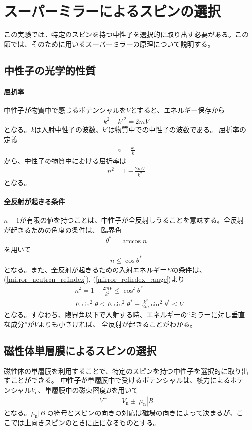 \section{スーパーミラーによるスピンの選択}
\nocite{neutron_spin_optics}
この実験では、特定のスピンを持つ中性子を選択的に取り出す必要がある。この節では、そのために用いるスーパーミラーの原理について説明する。

\subsection{中性子の光学的性質}
\paragraph{屈折率}
中性子が物質中で感じるポテンシャルを$V$とすると、エネルギー保存から
\begin{align}
k^2-k'^2=2mV
\end{align}
となる。$k$は入射中性子の波数、$k'$は物質中での中性子の波数である。
屈折率の定義
\begin{align}
n=\frac{k'}{k}
\end{align}
から、中性子の物質中における屈折率は
\begin{align}
n^2=1-\frac{2mV}{k^2}\label{mirror_neutron_refindex}
\end{align}
となる。

\paragraph{全反射が起きる条件}\label{mirrir_perfect_reflection}
$n-1$が有限の値を持つことは、中性子が全反射しうることを意味する。全反射が起きるための角度の条件は、
臨界角
\begin{align}
\theta^*=\arccos{n}
\end{align}
を用いて
\begin{align}
n\leq\cos\theta^* \label{mirror_refindex_range}
\end{align}
となる。また、全反射が起きるための入射エネルギー$E$の条件は、(\ref{mirror_neutron_refindex}), (\ref{mirror_refindex_range})より
\begin{align}
&n^2=1-\frac{2mV}{k^2}\leq\cos^2\theta^*\\
&E\sin^2\theta\leq E\sin^2\theta^*=\frac{k^2}{2m}\sin^2\theta^*\leq V
\end{align}
となる。すなわち、臨界角以下で入射する時、エネルギーの``ミラーに対し垂直な成分''が$V$よりも小さければ、
全反射が起きることがわかる。

\subsection{磁性体単層膜によるスピンの選択}
磁性体の単層膜を利用することで、特定のスピンを持つ中性子を選択的に取り出すことができる。
中性子が単層膜中で受けるポテンシャルは、核力によるポテンシャル$V_\mathrm{n}$、単層膜中の磁束密度$B$を用いて
\begin{align}
V^{\pm}&=V_\mathrm{n}\pm|\mu_\mathrm{n}|B
\end{align}
となる。$\mu_\mathrm{n}|B|$の符号とスピンの向きの対応は磁場の向きによって決まるが、ここでは上向きスピンのときに正になるものとする。

